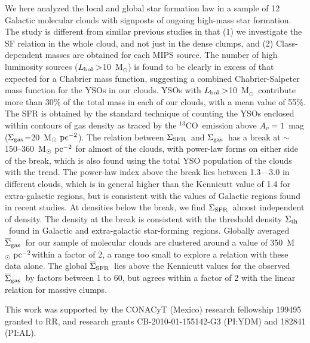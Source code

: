 \documentclass[iop]{emulateapj}
\newcommand{\msun}{M$_{\odot}$}
\newcommand{\starf}{star-forming}
\newcommand{\msunpc}{M$_{\odot}~{\rm pc}^{-2}$}
\newcommand{\sigsfr}{$\Sigma_{\rm SFR}$}
\newcommand{\siggas}{$\Sigma_{\rm gas}$}
\newcommand{\sigsfrav}{$\overline\Sigma_{\rm SFR}$}
\newcommand{\siggasav}{$\overline\Sigma_{\rm gas}$}
\newcommand{\sigth}{$\Sigma_{\rm th}$}
\newcommand{\co}{$^{13}$CO}
\begin{document}
We here analyzed the local and global star formation law in a sample of 
12 Galactic molecular clouds with signposts of ongoing high-mass star formation.
The study is different from similar previous studies in that 
(1) we investigate the SF relation in the whole cloud, and not just in the
dense clumps, and (2) Class-dependent masses are obtained for each MIPS source. 
The number of high luminosity sources ($L_{\rm bol}>$10~\msun) is found to be 
clearly in excess of that expected for a Chabrier mass function, suggesting
a combined Chabrier-Salpeter mass function for the YSOs in our clouds.
YSOs with $L_{\rm bol}>$10~\msun\ contribute more than 30\% of the total mass
in each of our clouds, with a mean value of 55\%.
The SFR is obtained by the standard technique of counting the YSOs 
enclosed within contours of gas
density as traced by the \co\ emission above $A_v=1$~mag (\siggas=20~\msunpc). 
The relation between \sigsfr\ and \siggas\ has a break at $\sim$150--360~\msunpc 
for almost of the clouds,
with power-law forms on either side of the break, which is also found using the 
total YSO population of the clouds with the trend. The power-law index above
the break lies between 1.3---3.0 in different clouds, which is
in general higher than the Kennicutt value of 1.4 for extra-galactic regions, but
is consistent with the values of Galactic regions found in recent studies. 
At densities below the break, we find \sigsfr\ almost independent of density.
The density at the break is consistent with the threshold density \sigth\ 
found in Galactic and extra-galactic \starf\ regions. 
Globally averaged \siggasav\ for our sample of molecular clouds are clustered around 
a value of 350~\msunpc within a factor of 2, a range too small to explore
a relation with these data alone. The global \sigsfrav\ lies above the
Kennicutt values for the observed \siggasav\ by factors between 1 to 60,
but agrees within a factor of 2 with the linear relation for massive clumps.

\acknowledgments
This work was supported by the CONACyT (Mexico) research fellowship 199495 granted
to RR, and research grants CB-2010-01-155142-G3 (PI:YDM) and 182841 (PI:AL).
\end{document}
